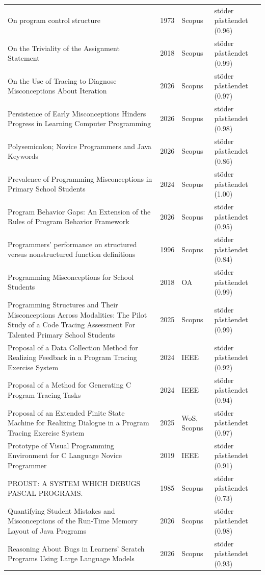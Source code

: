 \begin{longtable}{@{}%
  >{\raggedright\arraybackslash}p{}c%
  >{\raggedright\arraybackslash}p{}%
  >{\raggedright\arraybackslash}p{}@{}}
On program control structure & 1973 & Scopus & stöder påståendet (0.96) \\
On the Triviality of the Assignment Statement & 2018 & Scopus & stöder påståendet (0.99) \\
On the Use of Tracing to Diagnose Misconceptions About Iteration & 2026 & Scopus & stöder påståendet (0.97) \\
Persistence of Early Misconceptions Hinders Progress in Learning Computer Programming & 2026 & Scopus & stöder påståendet (0.98) \\
Polysemicolon; Novice Programmers and Java Keywords & 2026 & Scopus & stöder påståendet (0.86) \\
Prevalence of Programming Misconceptions in Primary School Students & 2024 & Scopus & stöder påståendet (1.00) \\
Program Behavior Gaps: An Extension of the Rules of Program Behavior Framework & 2026 & Scopus & stöder påståendet (0.95) \\
Programmers' performance on structured versus nonstructured function definitions & 1996 & Scopus & stöder påståendet (0.84) \\
Programming Misconceptions for School Students & 2018 & OA & stöder påståendet (0.99) \\
Programming Structures and Their Misconceptions Across Modalities: The Pilot Study of a Code Tracing Assessment For Talented Primary School Students & 2025 & Scopus & stöder påståendet (0.99) \\
Proposal of a Data Collection Method for Realizing Feedback in a Program Tracing Exercise System & 2024 & IEEE & stöder påståendet (0.92) \\
Proposal of a Method for Generating C Program Tracing Tasks & 2024 & IEEE & stöder påståendet (0.94) \\
Proposal of an Extended Finite State Machine for Realizing Dialogue in a Program Tracing Exercise System & 2025 & WoS, Scopus & stöder påståendet (0.97) \\
Prototype of Visual Programming Environment for C Language Novice Programmer & 2019 & IEEE & stöder påståendet (0.91) \\
PROUST: A SYSTEM WHICH DEBUGS PASCAL PROGRAMS. & 1985 & Scopus & stöder påståendet (0.73) \\
Quantifying Student Mistakes and Misconceptions of the Run-Time Memory Layout of Java Programs & 2026 & Scopus & stöder påståendet (0.98) \\
Reasoning About Bugs in Learners' Scratch Programs Using Large Language Models & 2026 & Scopus & stöder påståendet (0.93) \\

\end{longtable}
